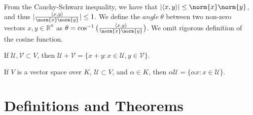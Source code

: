\documentclass[crop=false,class=book,oneside]{standalone}
\begin{document}
            \begin{remark}
            From the Cauchy-Schwarz inequality, we have that $|\langle x,y \rangle| \leq \norm{x}\norm{y}$, and thus $|\frac{\langle x,y \rangle}{\norm{x}\norm{y}}| \leq 1$. We define the $angle\ \theta$ between two non-zero vectors $x,y\in \mathbb{R}^n$ as $\theta=\cos^{-1}\big(\frac{\langle x,y \rangle}{\norm{x}\norm{y}}\big)$. We omit rigorous definition of the cosine function.
            \end{remark}
            \begin{definition}
            If $\mathcal{U},\mathcal{V}\subset V$, then $\mathcal{U}+\mathcal{V} = \{x+y:x\in \mathcal{U},y\in \mathcal{V}\}$.
            \end{definition}
            \begin{definition}
            If $V$ is a vector space over $K$, $\mathcal{U}\subset V$, and $\alpha \in K$, then $\alpha \mathcal{U} = \{\alpha x:x\in \mathcal{U}\}$.
            \end{definition}
    \section{Definitions and Theorems}
\end{document}
